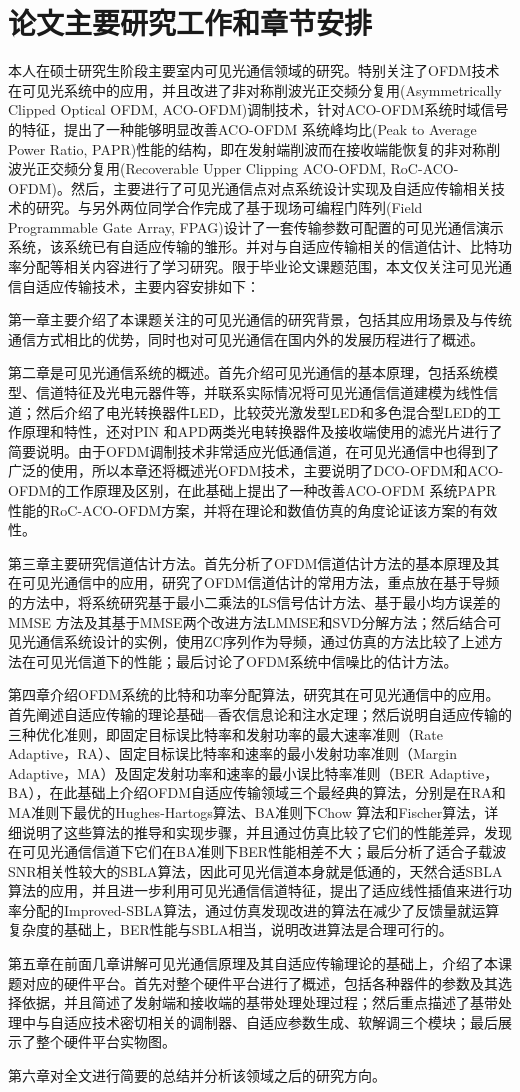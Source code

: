 \section{论文主要研究工作和章节安排}\label{sec:concept}
本人在硕士研究生阶段主要室内可见光通信领域的研究。特别关注了OFDM技术在可见光系统中的应用，并且改进了非对称削波光正交频分复用(Asymmetrically Clipped Optical OFDM, ACO-OFDM)调制技术，针对ACO-OFDM系统时域信号的特征，提出了一种能够明显改善ACO-OFDM 系统峰均比(Peak to Average Power Ratio, PAPR)性能的结构，即在发射端削波而在接收端能恢复的非对称削波光正交频分复用(Recoverable Upper Clipping ACO-OFDM, RoC-ACO-OFDM)\cite{xu2014aco}。然后，主要进行了可见光通信点对点系统设计实现及自适应传输相关技术的研究。与另外两位同学合作完成了基于现场可编程门阵列(Field Programmable Gate Array, FPAG)设计了一套传输参数可配置的可见光通信演示系统，该系统已有自适应传输的雏形。并对与自适应传输相关的信道估计、比特功率分配等相关内容进行了学习研究。限于毕业论文课题范围，本文仅关注可见光通信自适应传输技术，主要内容安排如下：

第一章主要介绍了本课题关注的可见光通信的研究背景，包括其应用场景及与传统通信方式相比的优势，同时也对可见光通信在国内外的发展历程进行了概述。

第二章是可见光通信系统的概述。首先介绍可见光通信的基本原理，包括系统模型、信道特征及光电元器件等，并联系实际情况将可见光通信信道建模为线性信道；然后介绍了电光转换器件LED，比较荧光激发型LED和多色混合型LED的工作原理和特性，还对PIN 和APD两类光电转换器件及接收端使用的滤光片进行了简要说明。由于OFDM调制技术非常适应光低通信道，在可见光通信中也得到了广泛的使用，所以本章还将概述光OFDM技术，主要说明了DCO-OFDM和ACO-OFDM的工作原理及区别，在此基础上提出了一种改善ACO-OFDM 系统PAPR 性能的RoC-ACO-OFDM方案，并将在理论和数值仿真的角度论证该方案的有效性。

第三章主要研究信道估计方法。首先分析了OFDM信道估计方法的基本原理及其在可见光通信中的应用，研究了OFDM信道估计的常用方法，重点放在基于导频的方法中，将系统研究基于最小二乘法的LS信号估计方法、基于最小均方误差的MMSE 方法及其基于MMSE两个改进方法LMMSE和SVD分解方法；然后结合可见光通信系统设计的实例，使用ZC序列作为导频，通过仿真的方法比较了上述方法在可见光信道下的性能；最后讨论了OFDM系统中信噪比的估计方法。

第四章介绍OFDM系统的比特和功率分配算法，研究其在可见光通信中的应用。首先阐述自适应传输的理论基础—香农信息论和注水定理；然后说明自适应传输的三种优化准则，即固定目标误比特率和发射功率的最大速率准则（Rate Adaptive，RA）、固定目标误比特率和速率的最小发射功率准则（Margin Adaptive，MA）及固定发射功率和速率的最小误比特率准则（BER Adaptive，BA），在此基础上介绍OFDM自适应传输领域三个最经典的算法，分别是在RA和MA准则下最优的Hughes-Hartogs算法、BA准则下Chow 算法和Fischer算法，详细说明了这些算法的推导和实现步骤，并且通过仿真比较了它们的性能差异，发现在可见光通信信道下它们在BA准则下BER性能相差不大；最后分析了适合子载波SNR相关性较大的SBLA算法，因此可见光信道本身就是低通的，天然合适SBLA算法的应用，并且进一步利用可见光通信信道特征，提出了适应线性插值来进行功率分配的Improved-SBLA算法，通过仿真发现改进的算法在减少了反馈量就运算复杂度的基础上，BER性能与SBLA相当，说明改进算法是合理可行的。

第五章在前面几章讲解可见光通信原理及其自适应传输理论的基础上，介绍了本课题对应的硬件平台。首先对整个硬件平台进行了概述，包括各种器件的参数及其选择依据，并且简述了发射端和接收端的基带处理处理过程；然后重点描述了基带处理中与自适应技术密切相关的调制器、自适应参数生成、软解调三个模块；最后展示了整个硬件平台实物图。

第六章对全文进行简要的总结并分析该领域之后的研究方向。
